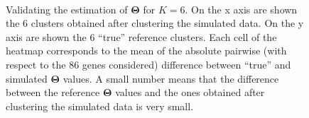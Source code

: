 \begin{figure}[H]
        \myfloatalign
         \\
        \caption{Validating the estimation of $\boldsymbol{\Theta}$ for $K=6$. On the x axis are shown the 6 clusters obtained after clustering the simulated data. On the y axis are shown the 6 ``true'' reference clusters. Each cell of the heatmap corresponds to the mean of the absolute pairwise (with respect to the 86 genes considered) difference between ``true'' and simulated $\boldsymbol{\Theta}$ values. A small number means that the difference between the reference $\boldsymbol{\Theta}$ values and the ones obtained after clustering the simulated data is very small.}\label{fig:theta_valid}
\end{figure}
	
